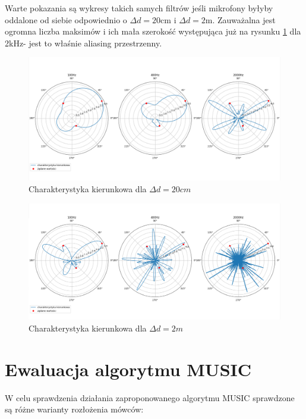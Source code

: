 \noindent Warte pokazania są wykresy takich samych filtrów jeśli mikrofony byłyby oddalone od siebie odpowiednio o $\Delta d = 20$cm i $\Delta d = 2$m. Zauważalna jest ogromna liczba maksimów i ich mała szerokość występująca już na rysunku \ref{fig:directivity0.2} dla 2kHz- jest to właśnie aliasing przestrzenny.

\begin{figure}[h!]
    \centering
    \includegraphics[width=\textwidth]{Images/directivity0.2m.png}
    \caption{Charakterystyka kierunkowa dla $\Delta d = 20cm$}
    \label{fig:directivity0.2}
\end{figure}

\begin{figure}[h!]
    \centering
    \includegraphics[width=\textwidth]{Images/directivity2m.png}
    \caption{Charakterystyka kierunkowa dla $\Delta d = 2m$}
    \label{fig:directivity2}
\end{figure}

\newpage

\section{Ewaluacja algorytmu MUSIC}

\noindent W celu sprawdzenia działania zaproponowanego algorytmu MUSIC sprawdzone są różne warianty rozłożenia mówców:

